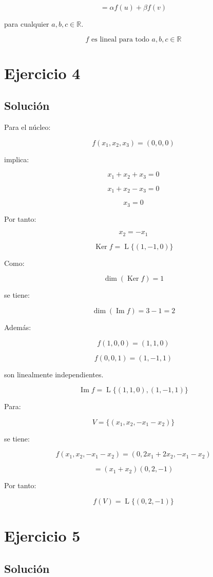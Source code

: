 \documentclass[11pt,a4paper]{article}
\newcommand{\R}{\mathbb{R}}
\newcommand{\Ker}{\operatorname{Ker}}
\newcommand{\Ima}{\operatorname{Im}}
\newcommand{\Span}{\operatorname{L}}
\begin{document}
	\[
	=
	\alpha f(u)+\beta f(v)
	\]

	para cualquier $a,b,c\in\R$.

	\[
	\boxed{
	f\text{ es lineal para todo }a,b,c\in\R
	}
	\]

\section{Ejercicio 4}
	\subsection{Solución}

	Para el núcleo:

	\[
	f(x_1,x_2,x_3)=(0,0,0)
	\]

	implica:

	\[
	x_1+x_2+x_3=0
	\]

	\[
	x_1+x_2-x_3=0
	\]

	\[
	x_3=0
	\]

	Por tanto:

	\[
	x_2=-x_1
	\]

	\[
	\boxed{
	\Ker f
	=
	\Span\{(1,-1,0)\}
	}
	\]

	Como:

	\[
	\dim(\Ker f)=1
	\]

	se tiene:

	\[
	\dim(\Ima f)=3-1=2
	\]

	Además:

	\[
	f(1,0,0)=(1,1,0)
	\]

	\[
	f(0,0,1)=(1,-1,1)
	\]

	son linealmente independientes.

	\[
	\boxed{
	\Ima f
	=
	\Span\{(1,1,0),(1,-1,1)\}
	}
	\]

	Para:

	\[
	V=
	\{(x_1,x_2,-x_1-x_2)\}
	\]

	se tiene:

	\[
	f(x_1,x_2,-x_1-x_2)
	=
	(0,2x_1+2x_2,-x_1-x_2)
	\]

	\[
	=
	(x_1+x_2)(0,2,-1)
	\]

	Por tanto:

	\[
	\boxed{
	f(V)=\Span\{(0,2,-1)\}
	}
	\]

\section{Ejercicio 5}
	\subsection{Solución}
\end{document}
